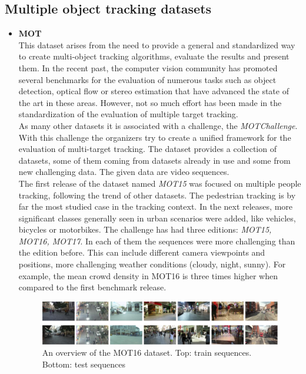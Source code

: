 \subsection{Multiple object tracking datasets}
\begin{itemize}
\item \textbf{MOT} ~\cite{milan2016mot16}\\
This dataset arises from the need to provide a general and standardized way to create multi-object tracking algorithms, evaluate the results and present them. In the recent past, the computer vision community has promoted several benchmarks for the evaluation of numerous tasks such as object detection, optical flow or stereo estimation that have advanced the state of the art in these areas. However, not so much effort has been made in the standardization of the evaluation of multiple target tracking.\\
As many other datasets it is associated with a challenge, the \textit{MOTChallenge}. With this challenge the organizers try to create a unified framework for the evaluation of multi-target tracking. The dataset provides a collection of datasets, some of them coming from datasets already in use and some from new challenging data. The given data are video sequences.\\
The first release of the dataset named \textit{MOT15} was focused on multiple people tracking, following the trend of other datasets. The pedestrian tracking is by far the most studied case in the tracking context. In the next releases, more significant classes generally seen in urban scenarios were added, like vehicles, bicycles or motorbikes. The challenge has had three editions: \textit{MOT15, MOT16, MOT17}. In each of them the sequences were more challenging than the edition before. This can include different camera viewpoints and positions, more challenging weather conditions (cloudy, night, sunny). For example, the mean crowd density in MOT16 is three times higher when compared to the first benchmark release.
\begin{figure}[H]
\begin{center}
\includegraphics[scale=0.4]{previous_version/mot16.png}
\caption{An overview of the MOT16 dataset. Top: train sequences. Bottom: test sequences ~\cite{milan2016mot16}}

\end{center}
\end{figure}
\end{itemize}
